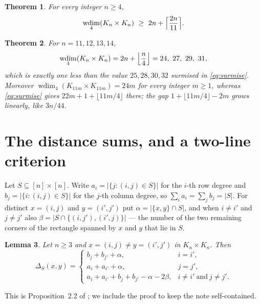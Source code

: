 \documentclass[11pt]{amsart}
\newtheorem{theorem}{Theorem}[section]
\newtheorem{lemma}[theorem]{Lemma}
\theoremstyle{remark}
\DeclareMathOperator{\wdim}{wdim}
\begin{document}
\begin{theorem}\label{thm:lower}
For every integer $n\ge4$,
\[
  \wdim_4(K_n\times K_n)\ \ge\ 2n+\Bigl\lceil\frac{2n}{11}\Bigr\rceil .
\]
\end{theorem}

\begin{theorem}\label{thm:exact}
For $n=11,12,13,14$,
\[
  \wdim_4(K_n\times K_n)=2n+\Bigl\lfloor\frac n4\Bigr\rfloor
  =24,\ 27,\ 29,\ 31 ,
\]
which is exactly one less than the value $25,28,30,32$ surmised in
\eqref{eq:surmise}. Moreover
$\wdim_4(K_{11m}\times K_{11m})=24m$ for every integer $m\ge1$, whereas
\eqref{eq:surmise} gives $22m+1+\lfloor 11m/4\rfloor$ there; the gap
$1+\lfloor 11m/4\rfloor-2m$ grows linearly, like $3n/44$.
\end{theorem}

\section{The distance sums, and a two-line criterion}\label{sec:crit}

Let $S\subseteq[n]\times[n]$. Write $a_i=\lvert\{j:(i,j)\in S\}\rvert$ for the
$i$-th row degree and $b_j=\lvert\{i:(i,j)\in S\}\rvert$ for the $j$-th column
degree, so $\sum_ia_i=\sum_jb_j=\lvert S\rvert$. For distinct
$x=(i,j)$ and $y=(i',j')$ put $\alpha=\lvert\{x,y\}\cap S\rvert$, and when
$i\ne i'$ and $j\ne j'$ also
$\beta=\lvert S\cap\{(i,j'),(i',j)\}\rvert$ --- the number of the two remaining
corners of the rectangle spanned by $x$ and $y$ that lie in $S$.

\begin{lemma}\label{lem:delta}
Let $n\ge3$ and $x=(i,j)\ne y=(i',j')$ in $K_n\times K_n$. Then
\[
  \Delta_S(x,y)=
  \begin{cases}
    b_j+b_{j'}+\alpha, & i=i',\\[2pt]
    a_i+a_{i'}+\alpha, & j=j',\\[2pt]
    a_i+a_{i'}+b_j+b_{j'}-\alpha-2\beta, & i\ne i'\ \text{and}\ j\ne j'.
  \end{cases}
\]
\end{lemma}

This is Proposition~2.2 of \cite{FKY}; we include the proof to keep the note
self-contained.
\end{document}
